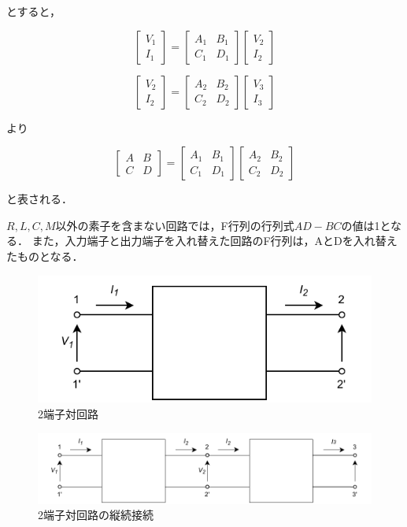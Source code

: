 とすると，

$$
\left[\begin{array}{l}
V_1 \\
I_1
\end{array}\right]=\left[\begin{array}{ll}
A_1 & B_1 \\
C_1 & D_1
\end{array}\right]\left[\begin{array}{l}
V_2 \\
I_2
\end{array}\right]
$$

$$
\left[\begin{array}{c}
V_2 \\
I_2
\end{array}\right]=\left[\begin{array}{ll}
A_2 & B_2 \\
C_2 & D_2
\end{array}\right]\left[\begin{array}{l}
V_3 \\
I_3
\end{array}\right]
$$

より

$$
\left[\begin{array}{ll}
A & B \\
C & D
\end{array}\right]=\left[\begin{array}{ll}
A_1 & B_1 \\
C_1 & D_1
\end{array}\right]\left[\begin{array}{ll}
A_2 & B_2 \\
C_2 & D_2
\end{array}\right]
$$

と表される．


$R,L,C,M$以外の素子を含まない回路では，F行列の行列式$AD-BC$の値は1となる．
また，入力端子と出力端子を入れ替えた回路のF行列は，AとDを入れ替えたものとなる．

\begin{figure}
    \begin{center}
        \includegraphics[]{figure1.drawio.pdf}
        \caption{2端子対回路}
    \end{center}
\end{figure}

\begin{figure}
    \begin{center}
        \includegraphics[]{figure2.drawio.pdf}
        \caption{2端子対回路の縦続接続}
    \end{center}
\end{figure}